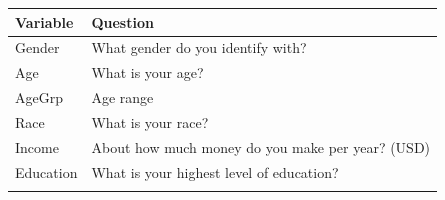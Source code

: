 \documentclass[]{book}
\begin{document}
\begin{longtable}[]{@{}ll@{}}
\toprule
\begin{minipage}[b]{0.11\columnwidth}\raggedright
\textbf{Variable}\strut
\end{minipage} & \begin{minipage}[b]{0.83\columnwidth}\raggedright
\textbf{Question}\strut
\end{minipage}\tabularnewline
\midrule
\endhead
\begin{minipage}[t]{0.11\columnwidth}\raggedright
Gender\strut
\end{minipage} & \begin{minipage}[t]{0.83\columnwidth}\raggedright
What gender do you identify with?\strut
\end{minipage}\tabularnewline
\begin{minipage}[t]{0.11\columnwidth}\raggedright
Age\strut
\end{minipage} & \begin{minipage}[t]{0.83\columnwidth}\raggedright
What is your age?\strut
\end{minipage}\tabularnewline
\begin{minipage}[t]{0.11\columnwidth}\raggedright
AgeGrp\strut
\end{minipage} & \begin{minipage}[t]{0.83\columnwidth}\raggedright
Age range\strut
\end{minipage}\tabularnewline
\begin{minipage}[t]{0.11\columnwidth}\raggedright
Race\strut
\end{minipage} & \begin{minipage}[t]{0.83\columnwidth}\raggedright
What is your race?\strut
\end{minipage}\tabularnewline
\begin{minipage}[t]{0.11\columnwidth}\raggedright
Income\strut
\end{minipage} & \begin{minipage}[t]{0.83\columnwidth}\raggedright
About how much money do you make per year? (USD)\strut
\end{minipage}\tabularnewline
\begin{minipage}[t]{0.11\columnwidth}\raggedright
Education\strut
\end{minipage} & \begin{minipage}[t]{0.83\columnwidth}\raggedright
What is your highest level of education?\strut
\end{minipage}\tabularnewline
\begin{minipage}[t]{0.11\columnwidth}\raggedright

\end{minipage}
\end{longtable}
\end{document}
